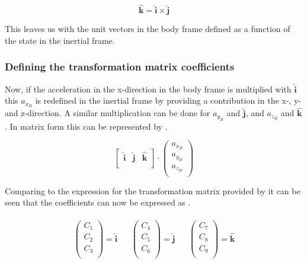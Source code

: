 \begin{equation} \label{eq:kHat}
\mathbf{\hat{k}} = \mathbf{\hat{i}} \times \mathbf{\hat{j}}
\end{equation}

This leaves us with the unit vectors in the body frame defined as a function of the state in the inertial frame. 

\subsubsection{Defining the transformation matrix coefficients}
\label{subsubsec:filTransMat}
Now, if the acceleration in the x-direction in the body frame is multiplied with $\mathbf{\hat{i}}$ this $a_{x_{B}}$ is redefined in the inertial frame by providing a contribution in the x-, y- and z-direction. A similar multiplication can be done for $a_{y_{B}}$ and $\mathbf{\hat{j}}$, and $a_{z_{B}}$ and $\mathbf{\hat{k}}$. In matrix form this can be represented by .

\begin{equation} \label{eq:firstFillEx}
\left[
\begin{matrix}
\mathbf{\hat{i}} &
\mathbf{\hat{j}} &
\mathbf{\hat{k}} \\
\end{matrix}
\right]
\cdot
\begin{pmatrix}
a_{x_{B}} \\
a_{y_{B}} \\
a_{z_{B}} \\
\end{pmatrix}
\end{equation}

Comparing  to the expression for the transformation matrix provided by  it can be seen that the coefficients can now be expressed as .

\begin{align} \label{eq:transCoeff}
\begin{split}
\begin{pmatrix}
C_{1} \\
C_{2} \\
C_{3} \\
\end{pmatrix}
=
\mathbf{\hat{i}}
\end{split}
&
\begin{split}
\begin{pmatrix}
C_{4} \\
C_{5} \\
C_{6} \\
\end{pmatrix}
=
\mathbf{\hat{j}}
\end{split}
&
\begin{split}
\begin{pmatrix}
C_{7} \\
C_{8} \\
C_{9} \\
\end{pmatrix}
=
\mathbf{\hat{k}}
\end{split}
\end{align}

